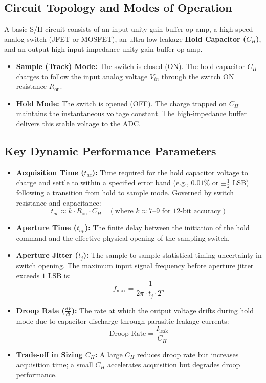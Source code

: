 \documentclass[12pt,a4paper]{article}
\begin{document}
\subsection{Circuit Topology and Modes of Operation}
A basic S/H circuit consists of an input unity-gain buffer op-amp, a high-speed analog switch (JFET or MOSFET), an ultra-low leakage \textbf{Hold Capacitor ($C_H$)}, and an output high-input-impedance unity-gain buffer op-amp.
\begin{itemize}[leftmargin=*, itemsep=3pt]
  \item \textbf{Sample (Track) Mode:} The switch is closed (ON). The hold capacitor $C_H$ charges to follow the input analog voltage $V_{in}$ through the switch ON resistance $R_{\text{on}}$.
  \item \textbf{Hold Mode:} The switch is opened (OFF). The charge trapped on $C_H$ maintains the instantaneous voltage constant. The high-impedance buffer delivers this stable voltage to the ADC.
\end{itemize}

\subsection{Key Dynamic Performance Parameters}
\begin{itemize}[leftmargin=*, itemsep=3pt]
  \item \textbf{Acquisition Time ($t_{ac}$):} Time required for the hold capacitor voltage to charge and settle to within a specified error band (e.g., $0.01\%$ or $\pm \frac{1}{2}\text{ LSB}$) following a transition from hold to sample mode. Governed by switch resistance and capacitance:
  \begin{equation}
    t_{ac} \approx k \cdot R_{\text{on}} \cdot C_H \quad (\text{where } k \approx 7\text{--}9 \text{ for 12-bit accuracy})
  \end{equation}
  \item \textbf{Aperture Time ($t_{ap}$):} The finite delay between the initiation of the hold command and the effective physical opening of the sampling switch.
  \item \textbf{Aperture Jitter ($t_j$):} The sample-to-sample statistical timing uncertainty in switch opening. The maximum input signal frequency before aperture jitter exceeds $1\text{ LSB}$ is:
  \begin{equation}
    f_{\max} = \frac{1}{2\pi \cdot t_j \cdot 2^n}
  \end{equation}
  \item \textbf{Droop Rate ($\frac{dV}{dt}$):} The rate at which the output voltage drifts during hold mode due to capacitor discharge through parasitic leakage currents:
  \begin{equation}
    \text{Droop Rate} = \frac{I_{\text{leak}}}{C_H}
  \end{equation}
  \item \textbf{Trade-off in Sizing $C_H$:} A large $C_H$ reduces droop rate but increases acquisition time; a small $C_H$ accelerates acquisition but degrades droop performance.
\end{itemize}
\end{document}
